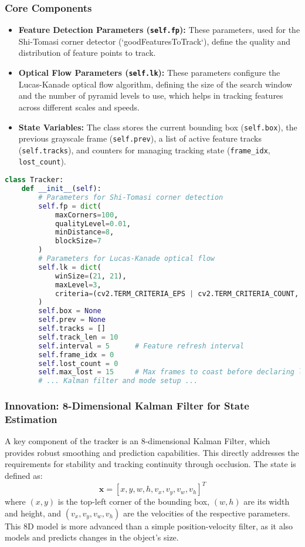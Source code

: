 \documentclass[12pt, a4paper]{article}
\begin{document}
\subsubsection{Core Components}
\begin{itemize}
    \item \textbf{Feature Detection Parameters (\texttt{self.fp}):} These parameters, used for the Shi-Tomasi corner detector (`goodFeaturesToTrack`), define the quality and distribution of feature points to track.
    \item \textbf{Optical Flow Parameters (\texttt{self.lk}):} These parameters configure the Lucas-Kanade optical flow algorithm, defining the size of the search window and the number of pyramid levels to use, which helps in tracking features across different scales and speeds.
    \item \textbf{State Variables:} The class stores the current bounding box (\texttt{self.box}), the previous grayscale frame (\texttt{self.prev}), a list of active feature tracks (\texttt{self.tracks}), and counters for managing tracking state (\texttt{frame\_idx}, \texttt{lost\_count}).
\end{itemize}

\begin{lstlisting}[language=Python, caption={Tracker class constructor (abridged) showing core components.}, label={lst:custom_init}]
class Tracker:
    def __init__(self):
        # Parameters for Shi-Tomasi corner detection
        self.fp = dict(
            maxCorners=100,
            qualityLevel=0.01,
            minDistance=8,
            blockSize=7
        )
        # Parameters for Lucas-Kanade optical flow
        self.lk = dict(
            winSize=(21, 21),
            maxLevel=3,
            criteria=(cv2.TERM_CRITERIA_EPS | cv2.TERM_CRITERIA_COUNT, 30, 0.01)
        )
        self.box = None
        self.prev = None
        self.tracks = []
        self.track_len = 10
        self.interval = 5      # Feature refresh interval
        self.frame_idx = 0
        self.lost_count = 0
        self.max_lost = 15     # Max frames to coast before declaring lost
        # ... Kalman filter and mode setup ...
\end{lstlisting}

\subsubsection{Innovation: 8-Dimensional Kalman Filter for State Estimation}
A key component of the tracker is an 8-dimensional Kalman Filter, which provides robust smoothing and prediction capabilities. This directly addresses the requirements for stability and tracking continuity through occlusion. The state is defined as:
$$ \mathbf{x} = [x, y, w, h, v_x, v_y, v_w, v_h]^T $$
where $(x, y)$ is the top-left corner of the bounding box, $(w, h)$ are its width and height, and $(v_x, v_y, v_w, v_h)$ are the velocities of the respective parameters. This 8D model is more advanced than a simple position-velocity filter, as it also models and predicts changes in the object's size.
\end{document}
